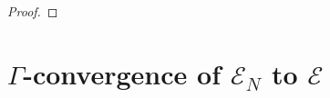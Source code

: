 \documentclass[A4paper,11pt]{article}
\theoremstyle{definition}
\newtheorem{remark}{Remark}
\newcommand{\R}{\mathbb{R}}
\DeclareMathOperator{\supp}{supp}
\begin{document}
\begin{proof}
\end{proof}
%


\section{$\Gamma$-convergence of $\mathcal E_N$ to $\mathcal E$}

\end{document}
